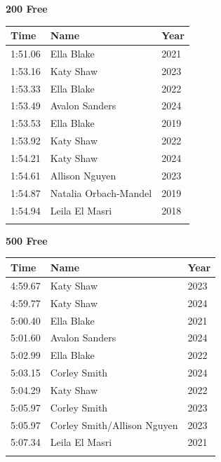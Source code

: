 \vspace{0.5em}
\noindent\begin{minipage}[t]{0.48\textwidth}
\centering
\textbf{\textcolor{teamprimary}{200 Free}}\par
\vspace{0.5em}
\centering
\small
\renewcommand{\arraystretch}{1.0}
\setlength{\tabcolsep}{4pt}
\begin{tabular}{@{}p{1.8cm}p{3.0cm}p{1.0cm}@{}}
\toprule
\textbf{Time} & \textbf{Name} & \textbf{Year} \\
\midrule
1:51.06 & Ella Blake & 2021 \\
1:53.16 & Katy Shaw & 2023 \\
1:53.33 & Ella Blake & 2022 \\
1:53.49 & Avalon Sanders & 2024 \\
1:53.53 & Ella Blake & 2019 \\
1:53.92 & Katy Shaw & 2022 \\
1:54.21 & Katy Shaw & 2024 \\
1:54.61 & Allison Nguyen & 2023 \\
1:54.87 & Natalia Orbach-Mandel & 2019 \\
1:54.94 & Leila El Masri & 2018 \\
\bottomrule
\vspace{0.5em}
\end{tabular}
\end{minipage}
\hfill
\begin{minipage}[t]{0.48\textwidth}
\centering
\textbf{\textcolor{teamprimary}{500 Free}}\par
\vspace{0.5em}
\centering
\small
\renewcommand{\arraystretch}{1.0}
\setlength{\tabcolsep}{4pt}
\begin{tabular}{@{}p{1.8cm}p{3.0cm}p{1.0cm}@{}}
\toprule
\textbf{Time} & \textbf{Name} & \textbf{Year} \\
\midrule
4:59.67 & Katy Shaw & 2023 \\
4:59.77 & Katy Shaw & 2024 \\
5:00.40 & Ella Blake & 2021 \\
5:01.60 & Avalon Sanders & 2024 \\
5:02.99 & Ella Blake & 2022 \\
5:03.15 & Corley Smith & 2024 \\
5:04.29 & Katy Shaw & 2022 \\
5:05.97 & Corley Smith & 2023 \\
5:05.97 & Corley Smith/Allison Nguyen & 2023 \\
5:07.34 & Leila El Masri & 2021 \\
\bottomrule
\vspace{0.5em}
\end{tabular}
\end{minipage}

